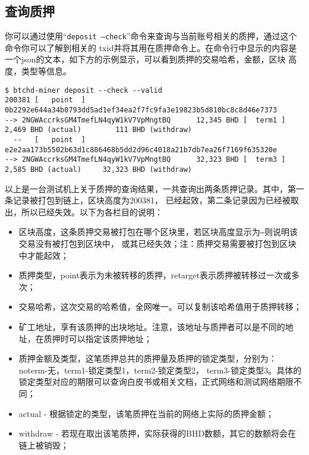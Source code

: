 \subsection{查询质押}
\begin{flushleft}
    你可以通过使用``\texttt{deposit --check}''命令来查询与当前账号相关的质押，通过这个命令你可以了解到相关的
    txid并将其用在质押命令上。在命令行中显示的内容是一个json的文本，如下方的示例显示，可以看到质押的交易哈希，金额，区块
    高度，类型等信息。
\end{flushleft}
\scriptsize
\begin{verbatim}
$ btchd-miner deposit --check --valid
200381 [   point  ] 0b2292e644a34b0793dd5ad1ef34ea2f7fc9fa3e19823b5d810bc8c8d46e7373
--> 2NGWAccrksGM4TmefLN4qyW1kV7VpMngtBQ      12,345 BHD [  term1 ]
2,469 BHD (actual)        111 BHD (withdraw)
  --   [   point  ] e2e2aa173b5502b63d1c886468b5dd2d96c4018a21b7db7ea26f7169f635320e
--> 2NGWAccrksGM4TmefLN4qyW1kV7VpMngtBQ      32,323 BHD [  term3 ]
2,585 BHD (actual)     32,323 BHD (withdraw)
\end{verbatim}
\normalsize
\begin{flushleft}
    以上是一台测试机上关于质押的查询结果，一共查询出两条质押记录。其中，第一条记录被打包到链上，区块高度为200381，
    已经起效，第二条记录因为已经被取出，所以已经失效。以下为各栏目的说明：
\end{flushleft}
\begin{itemize}
    \item 区块高度，这条质押交易被打包在哪个区块里，若区块高度显示为\texttt{---}则说明该交易没有被打包到区块中，
        或其已经失效；注：质押交易需要被打包到区块中才能起效；
    \item 质押类型，point表示为未被转移的质押，retarget表示质押被转移过一次或多次；
    \item 交易哈希，这次交易的哈希值，全网唯一。可以复制该哈希值用于质押转移；
    \item 矿工地址，享有该质押的出块地址。注意，该地址与质押者可以是不同的地址，在质押时可以指定该质押地址；
    \item 质押金额及类型，这笔质押总共的质押量及质押的锁定类型，分别为：noterm-无，term1-锁定类型1，term2-锁定类型2，
        term3-锁定类型3。具体的锁定类型对应的期限可以查询白皮书或相关文档，正式网络和测试网络期限不同；
    \item actual - 根据锁定的类型，该笔质押在当前的网络上实际的质押金额；
    \item withdraw - 若现在取出该笔质押，实际获得的BHD数额，其它的数额将会在链上被销毁；
\end{itemize}
